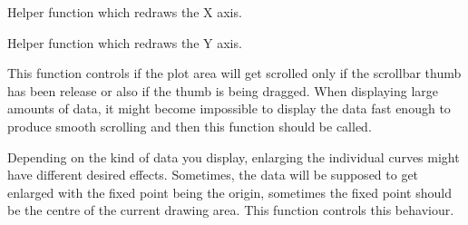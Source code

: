 
Helper function which redraws the X axis.

\label{wxplotwindowredrawyaxis}


Helper function which redraws the Y axis.

\label{wxplotwindowsetscrollonthumbrelease}


This function controls if the plot area will get scrolled only if the scrollbar thumb
has been release or also if the thumb is being dragged. When displaying large amounts
of data, it might become impossible to display the data fast enough to produce smooth
scrolling and then this function should be called.

\label{wxplotwindowsetenlargearoundwindowcentre}


Depending on the kind of data you display, enlarging the individual curves might
have different desired effects. Sometimes, the data will be supposed to get enlarged
with the fixed point being the origin, sometimes the fixed point should be the centre
of the current drawing area. This function controls this behaviour.

